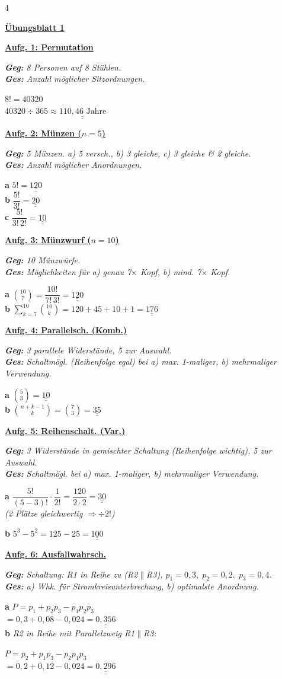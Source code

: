 \documentclass[landscape,a4paper,8pt]{article}
\newcommand{\aufgabe}[1]{\vspace{1pt}\textbf{\underline{#1}}\par}
\newcommand{\blatt}[1]{\smallskip\begin{center}\textbf{\normalsize\underline{#1}}\end{center}\par}
\newcommand{\teil}[1]{\textbf{#1}\;}
\newcommand{\erkl}[1]{{\small\textit{#1}}\par}
\newcommand{\erg}[1]{\underline{\underline{#1}}}
\begin{document}
\begin{multicols*}{4}

\blatt{Übungsblatt 1}

\aufgabe{Aufg. 1: Permutation}
\erkl{\textbf{Geg:} 8 Personen auf 8 Stühlen.\\\textbf{Ges:} Anzahl möglicher Sitzordnungen.}
$8! = 40320$\\
$40320 \div 365 \approx \erg{110{,}46 \text{ Jahre}}$

\aufgabe{Aufg. 2: Münzen ($n=5$)}
\erkl{\textbf{Geg:} 5 Münzen. a) 5 versch., b) 3 gleiche, c) 3 gleiche \& 2 gleiche.\\\textbf{Ges:} Anzahl möglicher Anordnungen.}
\teil{a} $5! = \erg{120}$\\
\teil{b} $\dfrac{5!}{3!} = \erg{20}$\\
\teil{c} $\dfrac{5!}{3!\,2!} = \erg{10}$

\aufgabe{Aufg. 3: Münzwurf ($n=10$)}
\erkl{\textbf{Geg:} 10 Münzwürfe.\\\textbf{Ges:} Möglichkeiten für a) genau 7$\times$ Kopf, b) mind. 7$\times$ Kopf.}
\teil{a} $\binom{10}{7}=\dfrac{10!}{7!\,3!}=\erg{120}$\\[2pt]
\teil{b} $\displaystyle\sum_{k=7}^{10}\binom{10}{k}=120+45+10+1=\erg{176}$

\aufgabe{Aufg. 4: Parallelsch. (Komb.)}
\erkl{\textbf{Geg:} 3 parallele Widerstände, 5 zur Auswahl.\\\textbf{Ges:} Schaltmögl. (Reihenfolge egal) bei a) max. 1-maliger, b) mehrmaliger Verwendung.}
\teil{a} $\binom{5}{3}=\erg{10}$\\
\teil{b} $\binom{n+k-1}{k}=\binom{7}{3}=\erg{35}$

\aufgabe{Aufg. 5: Reihenschalt. (Var.)}
\erkl{\textbf{Geg:} 3 Widerstände in gemischter Schaltung (Reihenfolge wichtig), 5 zur Auswahl.\\\textbf{Ges:} Schaltmögl. bei a) max. 1-maliger, b) mehrmaliger Verwendung.}
\teil{a} $\dfrac{5!}{(5-3)!}\cdot\dfrac{1}{2!}=\dfrac{120}{2\cdot2}=\erg{30}$\\
\erkl{(2 Plätze gleichwertig $\Rightarrow \div 2!$)}
\teil{b} $5^3-5^2=125-25=\erg{100}$

\aufgabe{Aufg. 6: Ausfallwahrsch.}
\erkl{\textbf{Geg:} Schaltung: R1 in Reihe zu (R2$\|$R3), $p_1{=}0{,}3,\;p_2{=}0{,}2,\;p_3{=}0{,}4$.\\\textbf{Ges:} a) Whk. für Stromkreisunterbrechung, b) optimalste Anordnung.}
\teil{a} $P=p_1+p_2 p_3-p_1 p_2 p_3$\\
$=0{,}3+0{,}08-0{,}024=\erg{0{,}356}$\\
\teil{b} \erkl{R2 in Reihe mit Parallelzweig R1$\|$R3:}
$P=p_2+p_1 p_3-p_2 p_1 p_3$\\
$=0{,}2+0{,}12-0{,}024=\erg{0{,}296}$


\end{multicols*}
\end{document}
